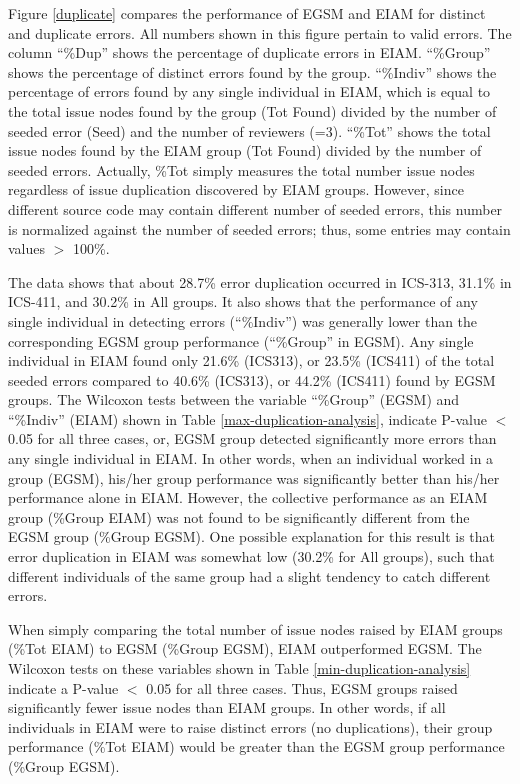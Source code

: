 Figure \ref{duplicate} compares the performance of EGSM and EIAM for
distinct and duplicate errors. All numbers shown in this figure
pertain to valid errors. 
The column ``\%Dup'' shows the percentage of duplicate errors in EIAM.
``\%Group'' shows the percentage of distinct errors
found by the group. ``\%Indiv'' shows the percentage of errors found by 
any single individual in EIAM, which is equal to the total issue nodes
found by the group (Tot Found) divided by the number of seeded error
(Seed) and the number of reviewers (=3).
``\%Tot'' shows the total issue nodes found by the
EIAM group (Tot Found) divided by the number of seeded errors. Actually,
\%Tot simply measures the total number issue nodes regardless of issue
duplication discovered by EIAM 
groups. However, since different source code may contain different number of
seeded errors, this number is normalized against the
number of seeded errors; thus, some entries may contain values $>$
100\%. 

The data shows that about 28.7\% error duplication occurred in
ICS-313, 31.1\% in ICS-411, and 30.2\% in All groups.
It also shows that the performance of any single individual
in detecting errors (``\%Indiv'') was generally lower than 
the corresponding EGSM group performance (``\%Group'' in EGSM). 
Any single individual in EIAM found  only 21.6\% 
(ICS313), or  23.5\% 
(ICS411) of the total seeded errors compared to 40.6\% (ICS313), or 44.2\%
(ICS411) found by EGSM groups. 
The Wilcoxon tests between the variable ``\%Group'' (EGSM) and ``\%Indiv''
(EIAM) shown in Table \ref{max-duplication-analysis},
indicate P-value $<$ 0.05 for all three cases, or,
EGSM group detected
significantly more errors than any single individual in EIAM.
In other words,
when an individual worked in a group (EGSM), his/her group performance was
significantly better than his/her performance alone in EIAM.
However, the collective performance as an EIAM group (\%Group EIAM)
was not found to be significantly different from the 
EGSM group (\%Group EGSM). 
One possible explanation for this result is that error duplication in
EIAM was somewhat low (30.2\% for All groups), such that
different individuals of the same group had a slight
tendency to catch  different errors.  

When simply comparing the total number of issue nodes raised
by EIAM groups (\%Tot EIAM) to EGSM  
(\%Group EGSM), EIAM outperformed EGSM.
The Wilcoxon tests on these variables shown in Table
\ref{min-duplication-analysis} indicate a P-value $<$
0.05 for all three cases. Thus, EGSM groups raised significantly fewer
issue nodes than EIAM groups.
In other words, if all individuals in EIAM were to
raise distinct errors (no duplications), their group performance
(\%Tot EIAM) would be greater than the EGSM group performance
(\%Group EGSM). 

